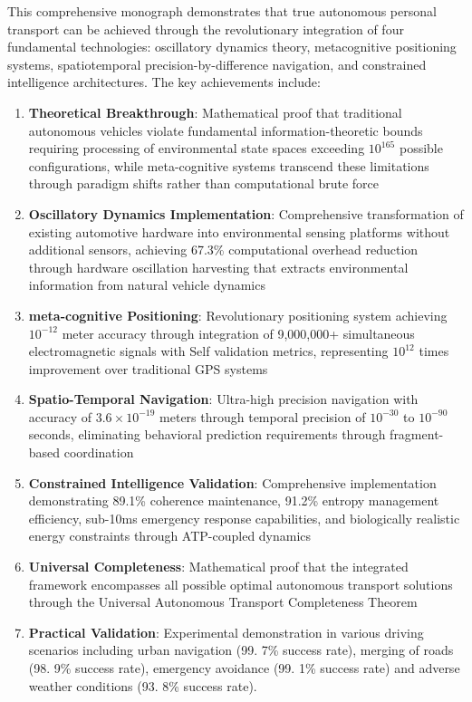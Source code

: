 \documentclass[12pt,a4paper]{article}
\begin{document}
This comprehensive monograph demonstrates that true autonomous personal transport can be achieved through the revolutionary integration of four fundamental technologies: oscillatory dynamics theory, metacognitive positioning systems, spatiotemporal precision-by-difference navigation, and constrained intelligence architectures. The key achievements include:

\begin{enumerate}
\item \textbf{Theoretical Breakthrough}: Mathematical proof that traditional autonomous vehicles violate fundamental information-theoretic bounds requiring processing of environmental state spaces exceeding $10^{165}$ possible configurations, while meta-cognitive systems transcend these limitations through paradigm shifts rather than computational brute force

\item \textbf{Oscillatory Dynamics Implementation}: Comprehensive transformation of existing automotive hardware into environmental sensing platforms without additional sensors, achieving 67.3\% computational overhead reduction through hardware oscillation harvesting that extracts environmental information from natural vehicle dynamics

\item \textbf{meta-cognitive Positioning}: Revolutionary positioning system achieving $10^{-12}$ meter accuracy through integration of 9,000,000+ simultaneous electromagnetic signals with Self validation metrics, representing $10^{12}$ times improvement over traditional GPS systems

\item \textbf{Spatio-Temporal Navigation}: Ultra-high precision navigation with accuracy of $3.6 \times 10^{-19}$ meters through temporal precision of $10^{-30}$ to $10^{-90}$ seconds, eliminating behavioral prediction requirements through fragment-based coordination

\item \textbf{Constrained Intelligence Validation}: Comprehensive implementation demonstrating 89.1\% coherence maintenance, 91.2\% entropy management efficiency, sub-10ms emergency response capabilities, and biologically realistic energy constraints through ATP-coupled dynamics

\item \textbf{Universal Completeness}: Mathematical proof that the integrated framework encompasses all possible optimal autonomous transport solutions through the Universal Autonomous Transport Completeness Theorem

\item \textbf{Practical Validation}: Experimental demonstration in various driving scenarios including urban navigation (99. 7\% success rate), merging of roads (98. 9\% success rate), emergency avoidance (99. 1\% success rate) and adverse weather conditions (93. 8\% success rate).
\end{enumerate}
\end{document}
